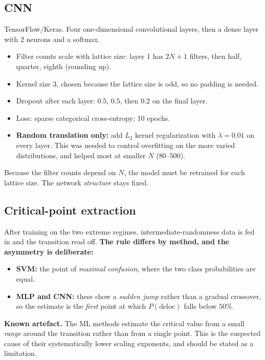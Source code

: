 \documentclass[11pt]{article}
\newcommand{\Pdeloc}{P(\text{deloc})}
\begin{document}
\subsection{CNN}
TensorFlow/Keras. Four one-dimensional convolutional layers, then a dense
layer with 2 neurons and a softmax.
\begin{itemize}
  \item Filter counts scale with lattice size: layer 1 has $2N+1$ filters,
        then half, quarter, eighth (rounding up).
  \item Kernel size 3, chosen because the lattice size is odd, so no padding
        is needed.
  \item Dropout after each layer: $0.5$, $0.5$, then $0.2$ on the final layer.
  \item Loss: sparse categorical cross-entropy; 10 epochs.
  \item \textbf{Random translation only:} add $L_2$ kernel regularization
        with $\lambda = 0.01$ on every layer. This was needed to control
        overfitting on the more varied distributions, and helped most at
        smaller $N$ ($80$--$500$).
\end{itemize}
Because the filter counts depend on $N$, the model must be retrained for each
lattice size. The network \emph{structure} stays fixed.

\subsection{Critical-point extraction}
\label{sec:critical}
After training on the two extreme regimes, intermediate-randomness data is fed
in and the transition read off. \textbf{The rule differs by method, and the
asymmetry is deliberate:}
\begin{itemize}
  \item \textbf{SVM:} the point of \emph{maximal confusion}, where the two
        class probabilities are equal.
  \item \textbf{MLP and CNN:} these show a \emph{sudden jump} rather than a
        gradual crossover, so the estimate is the \emph{first} point at which
        $\Pdeloc$ falls below $50\%$.
\end{itemize}

\noindent
\textbf{Known artefact.} The ML methods estimate the critical value from a
small \emph{range} around the transition rather than from a single point.
This is the suspected cause of their systematically lower scaling exponents,
and should be stated as a limitation.
\end{document}

